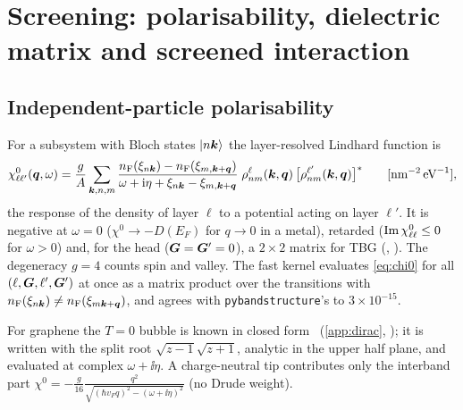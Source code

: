 \section{Screening: polarisability, dielectric matrix and screened interaction}
\label{sec:screening}

\subsection{Independent-particle polarisability}

For a subsystem with Bloch states $|n\bm k\rangle$ the layer-resolved Lindhard function is
\begin{equation}
\chi^0_{\ell\ell'}(\bm q,\omega)=\frac{g}{A}\sum_{\bm k,n,m}
\frac{n_{\rm F}(\xi_{n\bm k})-n_{\rm F}(\xi_{m,\bm k+\bm q})}{\omega+\mathrm i\eta+\xi_{n\bm k}-\xi_{m,\bm k+\bm q}}\;
\rho^\ell_{nm}(\bm k,\bm q)\,\bigl[\rho^{\ell'}_{nm}(\bm k,\bm q)\bigr]^*
\qquad[\text{nm}^{-2}\,\text{eV}^{-1}],
\label{eq:chi0}
\end{equation}
the response of the density of layer $\ell$ to a potential acting on layer $\ell'$. It is negative at
$\omega=0$ ($\chi^0\to-D(E_F)$ for $q\to0$ in a metal), retarded ($\operatorname{Im}\chi^0_{\ell\ell}\le0$ for
$\omega>0$) and, for the head ($\bm G=\bm G'=0$), a $2\times2$ matrix for TBG
(, ). The degeneracy $g=4$ counts spin and valley.
The fast kernel evaluates \cref{eq:chi0} for all $(\ell,\bm G,\ell',\bm G')$ at once as a matrix product over the
transitions with $n_{\rm F}(\xi_{n\bm k})\neq n_{\rm F}(\xi_{m\bm k+\bm q})$, and agrees with \texttt{pybandstructure}'s
 to $3\times10^{-15}$.

For graphene the $T=0$ bubble is known in closed form~\cite{Wunsch2006} (\cref{app:dirac},
); it is written with the split root $\sqrt{z-1}\sqrt{z+1}$, analytic in the upper
half plane, and evaluated at complex $\omega+\ii\eta$. A charge-neutral tip contributes only the interband part
$\chi^0=-\frac{g}{16}\frac{q^2}{\sqrt{(\hbar v_Fq)^2-(\omega+\ii\eta)^2}}$ (no Drude weight).

